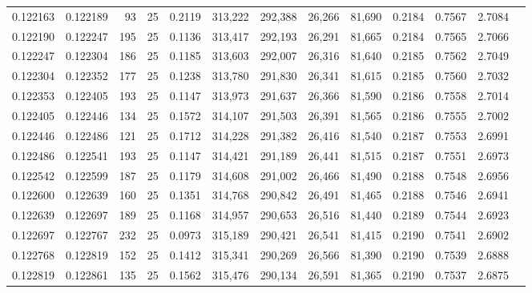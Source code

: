 \begin{tabular}{rrrrrrrrrrrrr}
0.122163 & 0.122189 &    93 &  25 &                                     0.2119 & 313,222 & 292,388 &  26,266 &  81,690 & 0.2184 & 0.7567 & 2.7084 \\
0.122190 & 0.122247 &   195 &  25 &                                     0.1136 & 313,417 & 292,193 &  26,291 &  81,665 & 0.2184 & 0.7565 & 2.7066 \\
0.122247 & 0.122304 &   186 &  25 &                                     0.1185 & 313,603 & 292,007 &  26,316 &  81,640 & 0.2185 & 0.7562 & 2.7049 \\
0.122304 & 0.122352 &   177 &  25 &                                     0.1238 & 313,780 & 291,830 &  26,341 &  81,615 & 0.2185 & 0.7560 & 2.7032 \\
0.122353 & 0.122405 &   193 &  25 &                                     0.1147 & 313,973 & 291,637 &  26,366 &  81,590 & 0.2186 & 0.7558 & 2.7014 \\
0.122405 & 0.122446 &   134 &  25 &                                     0.1572 & 314,107 & 291,503 &  26,391 &  81,565 & 0.2186 & 0.7555 & 2.7002 \\
0.122446 & 0.122486 &   121 &  25 &                                     0.1712 & 314,228 & 291,382 &  26,416 &  81,540 & 0.2187 & 0.7553 & 2.6991 \\
0.122486 & 0.122541 &   193 &  25 &                                     0.1147 & 314,421 & 291,189 &  26,441 &  81,515 & 0.2187 & 0.7551 & 2.6973 \\
0.122542 & 0.122599 &   187 &  25 &                                     0.1179 & 314,608 & 291,002 &  26,466 &  81,490 & 0.2188 & 0.7548 & 2.6956 \\
0.122600 & 0.122639 &   160 &  25 &                                     0.1351 & 314,768 & 290,842 &  26,491 &  81,465 & 0.2188 & 0.7546 & 2.6941 \\
0.122639 & 0.122697 &   189 &  25 &                                     0.1168 & 314,957 & 290,653 &  26,516 &  81,440 & 0.2189 & 0.7544 & 2.6923 \\
0.122697 & 0.122767 &   232 &  25 &                                     0.0973 & 315,189 & 290,421 &  26,541 &  81,415 & 0.2190 & 0.7541 & 2.6902 \\
0.122768 & 0.122819 &   152 &  25 &                                     0.1412 & 315,341 & 290,269 &  26,566 &  81,390 & 0.2190 & 0.7539 & 2.6888 \\
0.122819 & 0.122861 &   135 &  25 &                                     0.1562 & 315,476 & 290,134 &  26,591 &  81,365 & 0.2190 & 0.7537 & 2.6875 \\

\end{tabular}

